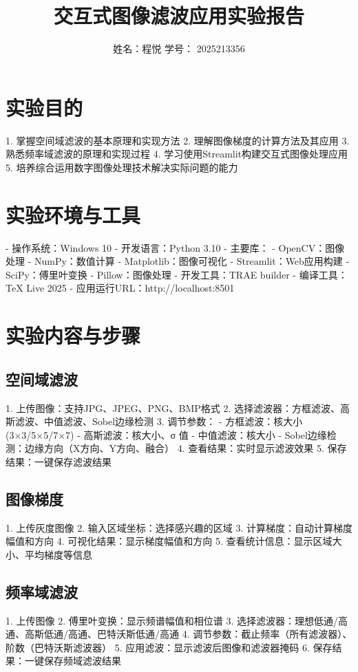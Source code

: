 \documentclass[12pt]{article}
\title{交互式图像滤波应用实验报告}
\author{姓名：程悦        学号：  2025213356      }
\begin{document}
\maketitle

\section{实验目的}
1. 掌握空间域滤波的基本原理和实现方法
2. 理解图像梯度的计算方法及其应用
3. 熟悉频率域滤波的原理和实现过程
4. 学习使用Streamlit构建交互式图像处理应用
5. 培养综合运用数字图像处理技术解决实际问题的能力

\section{实验环境与工具}
- 操作系统：Windows 10
- 开发语言：Python 3.10
- 主要库：
  - OpenCV：图像处理
  - NumPy：数值计算
  - Matplotlib：图像可视化
  - Streamlit：Web应用构建
  - SciPy：傅里叶变换
  - Pillow：图像处理
- 开发工具：TRAE builder
- 编译工具：TeX Live 2025
- 应用运行URL：http://localhost:8501

\section{实验内容与步骤}

\subsection{空间域滤波}
1. 上传图像：支持JPG、JPEG、PNG、BMP格式
2. 选择滤波器：方框滤波、高斯滤波、中值滤波、Sobel边缘检测
3. 调节参数：
   - 方框滤波：核大小 (3×3/5×5/7×7)
   - 高斯滤波：核大小、σ 值
   - 中值滤波：核大小
   - Sobel边缘检测：边缘方向（X方向、Y方向、融合）
4. 查看结果：实时显示滤波效果
5. 保存结果：一键保存滤波结果

\subsection{图像梯度}
1. 上传灰度图像
2. 输入区域坐标：选择感兴趣的区域
3. 计算梯度：自动计算梯度幅值和方向
4. 可视化结果：显示梯度幅值和方向
5. 查看统计信息：显示区域大小、平均梯度等信息

\subsection{频率域滤波}
1. 上传图像
2. 傅里叶变换：显示频谱幅值和相位谱
3. 选择滤波器：理想低通/高通、高斯低通/高通、巴特沃斯低通/高通
4. 调节参数：截止频率（所有滤波器）、阶数（巴特沃斯滤波器）
5. 应用滤波：显示滤波后图像和滤波器掩码
6. 保存结果：一键保存频域滤波结果
\end{document}
